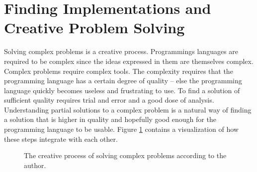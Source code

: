 \section{Finding Implementations and Creative Problem Solving}
Solving complex problems is a creative process. Programmings languages are required to be complex since the ideas expressed in them are themselves complex. Complex problems require complex tools. The complexity requires that the programming language
has a certain degree of quality -- else the programming language quickly becomes useless and frustrating to use. To find a solution of sufficient quality requires trial and error and a good dose of analysis. Understanding partial solutions to a complex problem is a natural way of finding a solution that is higher in quality and hopefully good enough for the programming language to be usable. Figure \ref{figCreativeProcess} contains a visualization of how these steps integrate with each other.


\begin{center}
\begin{figure}[h!]
\centering
{}
\caption{The creative process of solving complex problems according to the author.}
\label{figCreativeProcess}
\end{figure}
\end{center}
